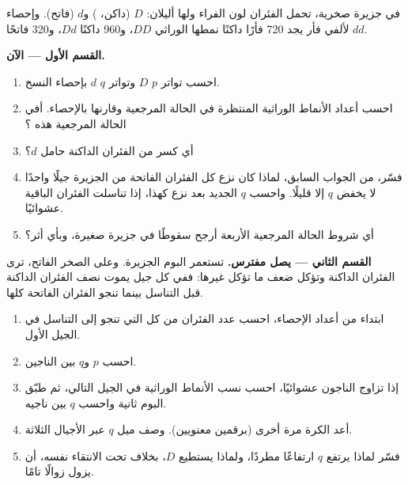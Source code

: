 \begin{problem}
\label{pb:g12:selection-drift-speciation:1}
في جزيرة صخرية، تحمل الفئران  لون الفراء ولها أليلان: $D$
(داكن، ) و$d$ (فاتح). وإحصاء لألفي فأر يجد 720 فأرًا داكنًا نمطها
الوراثي $DD$، و960 داكنًا $Dd$، و320 فاتحًا $dd$.

\medskip
\noindent\textbf{القسم الأول ---  الآن.}
\begin{enumerate}
  \item احسب تواتر $p$  $D$ وتواتر $q$  $d$ بإحصاء النسخ.
  \item احسب أعداد الأنماط الوراثية المنتظرة في الحالة المرجعية وقارنها
        بالإحصاء. أفي الحالة المرجعية هذه ؟
  \item أي كسر من الفئران الداكنة حامل  $d$؟
  \item فسّر، من الجواب السابق، لماذا كان نزع كل الفئران الفاتحة من
        الجزيرة جيلًا واحدًا لا يخفض $q$ إلا قليلًا. واحسب $q$ الجديد
        بعد نزع كهذا، إذا تناسلت الفئران الباقية عشوائيًا.
  \item أي شروط الحالة المرجعية الأربعة أرجح سقوطًا في جزيرة صغيرة،
        وبأي أثر؟
\end{enumerate}

\medskip
\noindent\textbf{القسم الثاني --- يصل مفترس.}
تستعمر البوم الجزيرة. وعلى الصخر الفاتح، ترى الفئران الداكنة وتؤكل
ضعف ما تؤكل غيرها: ففي كل جيل يموت نصف الفئران الداكنة قبل التناسل
بينما تنجو الفئران الفاتحة كلها.
\begin{enumerate}[resume]
  \item ابتداء من أعداد الإحصاء، احسب عدد الفئران من كل  التي
        تنجو إلى التناسل في الجيل الأول.
  \item احسب $p$ و$q$ بين الناجين.
  \item إذا تزاوج الناجون عشوائيًا، احسب نسب الأنماط الوراثية في الجيل
        التالي، ثم طبّق البوم ثانية واحسب $q$ بين ناجيه.
  \item أعد الكرة مرة أخرى (برقمين معنويين). وصف ميل $q$ عبر الأجيال
        الثلاثة.
  \item فسّر لماذا يرتفع $q$ ارتفاعًا مطردًا، ولماذا يستطيع $D$، بخلاف
          تحت الانتقاء نفسه، أن يزول زوالًا تامًا.
\end{enumerate}


\end{problem}
